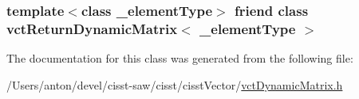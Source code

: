 \subsubsection[{vct\+Return\+Dynamic\+Matrix$<$ \+\_\+element\+Type $>$}]{\setlength{\rightskip}{0pt plus 5cm}template$<$class \+\_\+element\+Type$>$ friend class {\bf vct\+Return\+Dynamic\+Matrix}$<$ \+\_\+element\+Type $>$\hspace{0.3cm}{\ttfamily [friend]}}\label{classvct_dynamic_matrix_a15520a0716ed8e67f2cba2a95cbe51a7}


The documentation for this class was generated from the following file\+:\begin{DoxyCompactItemize}
\item 
/\+Users/anton/devel/cisst-\/saw/cisst/cisst\+Vector/\hyperlink{vct_dynamic_matrix_8h}{vct\+Dynamic\+Matrix.\+h}\end{DoxyCompactItemize}
